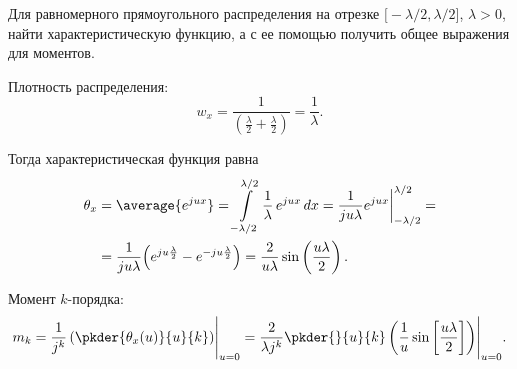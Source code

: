 \documentclass[pscyr]{hedwork}
\begin{document}
  \begin{task*}{49}{
    Для равномерного прямоугольного распределения на отрезке
    \( \bigl[-\lambda / 2, \lambda / 2 \big] \), \( \lambda > 0 \), найти
    характеристическую функцию, а с ее помощью получить общее выражения для
    моментов.
  }

    Плотность распределения:
    \[
      w_x = \frac{1}{\left(\frac{\lambda}{2} + \frac{\lambda}{2}\right)} =
        \frac{1}{\lambda}.
    \]

    Тогда характеристическая функция равна
    \begin{align*}
      \theta_x & = \average{e^{jux}} = \int\limits_{-\lambda/2}^{\lambda/2}
        \frac{1}{\lambda}\,e^{jux}\,dx = \frac{1}{ju\lambda}
        e^{jux}\bigg|_{-\lambda/2}^{\lambda/2} = \\
      & = \frac{1}{ju\lambda} \Bigl(e^{ju\frac{\lambda}{2}} -
        e^{-ju\frac{\lambda}{2}}\Big) =
        \frac{2}{u\lambda}\sin\left(\frac{u\lambda}{2}\right).
    \end{align*}

    Момент \( k \)-порядка:
    \[
      m_k = \frac{1}{j^k} \left(\pkder{\theta_x(u)}{u}{k}\right)\Biggr|_{u=0} =
        \frac{2}{\lambda j^k} \pkder{}{u}{k}\left( \frac{1}{u}
        \sin\left[\frac{u\lambda}{2}\right] \right)\Biggr|_{u=0}.
    \]

  \end{task*}
\end{document}
